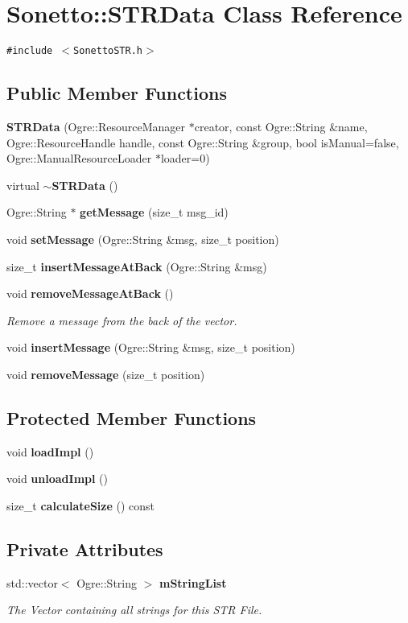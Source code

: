 \section{Sonetto::STRData Class Reference}
\label{class_sonetto_1_1_s_t_r_data}
{\tt \#include $<$SonettoSTR.h$>$}

\subsection*{Public Member Functions}
\begin{CompactItemize}
\item 
{\bf STRData} (Ogre::ResourceManager $\ast$creator, const Ogre::String \&name, Ogre::ResourceHandle handle, const Ogre::String \&group, bool isManual=false, Ogre::ManualResourceLoader $\ast$loader=0)
\item 
virtual {\bf $\sim$STRData} ()
\item 
Ogre::String $\ast$ {\bf getMessage} (size\_\-t msg\_\-id)
\item 
void {\bf setMessage} (Ogre::String \&msg, size\_\-t position)
\item 
size\_\-t {\bf insertMessageAtBack} (Ogre::String \&msg)
\item 
void {\bf removeMessageAtBack} ()
\begin{CompactList}\small\item\em Remove a message from the back of the vector. \item\end{CompactList}\item 
void {\bf insertMessage} (Ogre::String \&msg, size\_\-t position)
\item 
void {\bf removeMessage} (size\_\-t position)
\end{CompactItemize}
\subsection*{Protected Member Functions}
\begin{CompactItemize}
\item 
void {\bf loadImpl} ()
\item 
void {\bf unloadImpl} ()
\item 
size\_\-t {\bf calculateSize} () const 
\end{CompactItemize}
\subsection*{Private Attributes}
\begin{CompactItemize}
\item 
std::vector$<$ Ogre::String $>$ {\bf mStringList}
\begin{CompactList}\small\item\em The Vector containing all strings for this STR File. \item\end{CompactList}\end{CompactItemize}


